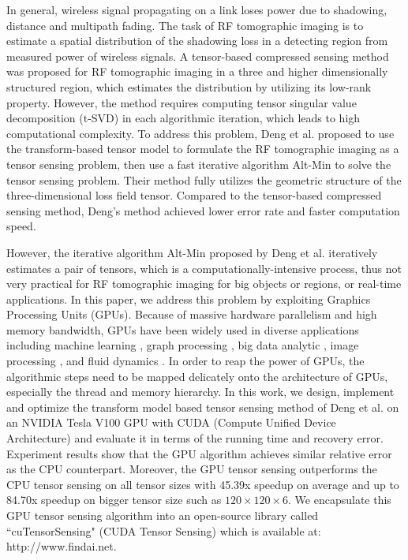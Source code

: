\documentclass[futureinternet,article,submit,moreauthors,pdftex,10pt,a4paper]{Definitions/mdpi}
\theoremstyle{plain}
\theoremstyle{definition}
\theoremstyle{remark}
\begin{document}
In general, wireless signal propagating on a link loses power due to shadowing, distance and multipath fading. The task of RF tomographic imaging is to estimate a spatial distribution of the shadowing loss in a detecting region from measured power of wireless signals. A tensor-based compressed sensing method \cite{matsuda2017multi} was proposed for RF tomographic imaging in a three and higher dimensionally structured region, which estimates the distribution by utilizing its low-rank property. However, the method requires computing tensor singular value decomposition (t-SVD) in each algorithmic iteration, which leads to high computational complexity. To address this problem, Deng et al. \cite{deng2018tensor} proposed to use the transform-based tensor model to formulate the RF tomographic imaging as a tensor sensing problem, then use a fast iterative algorithm Alt-Min to solve the tensor sensing problem. Their method fully utilizes the geometric structure of the three-dimensional loss field tensor. Compared to the tensor-based compressed sensing method, Deng's method achieved lower error rate and faster computation speed.

However, the iterative algorithm Alt-Min proposed by Deng et al.\cite{deng2018tensor} iteratively estimates a pair of tensors, which is a computationally-intensive process, thus not very practical for RF tomographic imaging for big objects or regions, or real-time applications. In this paper, we address this problem by exploiting Graphics Processing Units (GPUs). Because of massive hardware parallelism and high memory bandwidth, GPUs have been widely used in diverse applications including machine learning \cite{cui2016geeps} \cite{brito2017detecting} \cite{campos2017scaling}, graph processing \cite{shi2018frog} \cite{zhong2017optimizing} \cite{pan2017multi}, big data analytic \cite{gutierrez2017smote} \cite{rathore2017real}, image processing \cite{devadithya2017gpu}, and fluid dynamics \cite{verma2017advanced}. In order to reap the power of GPUs, the algorithmic steps need to be mapped delicately onto the architecture of GPUs, especially the thread and memory hierarchy.  In this work, we design, implement and optimize the transform model based tensor sensing method of Deng et al. \cite{deng2018tensor} on an NVIDIA Tesla V100 GPU with CUDA (Compute Unified Device Architecture) and evaluate it in terms of the running time and recovery error. Experiment results show that the GPU algorithm achieves similar relative error as the CPU counterpart. Moreover, the GPU tensor sensing outperforms the CPU tensor sensing on all tensor sizes with 45.39x speedup on average and up to 84.70x speedup on bigger tensor size such as $120 \times 120 \times 6$. We encapsulate this GPU tensor sensing algorithm into an open-source library called ``cuTensorSensing" (CUDA Tensor Sensing) which is available at: http://www.findai.net.
\end{document}
